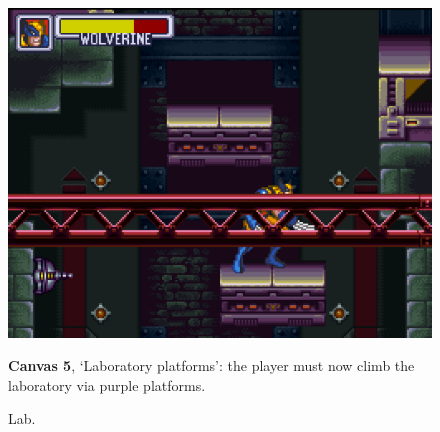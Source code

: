 \documentclass[english]{textolivre}
\begin{document}
\begin{figure}[htbp]
\begin{minipage}[t]{.47\textwidth}
\vspace{0pt}
\includegraphics[width=\textwidth]{fig-011.png}
\caption{Lab.}
\label{fig-011}
\end{minipage}
\hfill
\begin{minipage}[t]{.47\textwidth}
\vspace{2pt}
\textbf{Canvas 5}, ‘Laboratory platforms’: the player must now climb the laboratory via purple platforms.
\end{minipage}
\end{figure}
\end{document}
